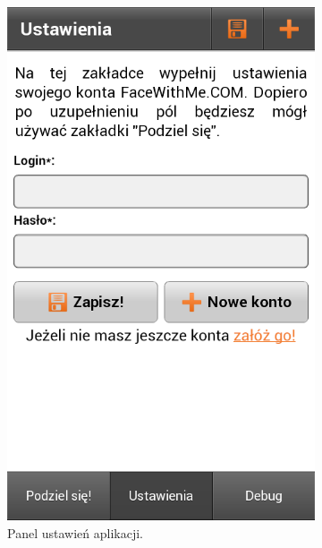 \begin{figure}[ht]
    \centering
    \begin{subfigure}{0.3\textwidth}
        \centering
        \includegraphics[width=\textwidth]{img/screens/mobile_broadcaster/panel-ustawien.png}
        \caption{Panel ustawień aplikacji.}
        \label{fig:MB3}
    \end{subfigure}
    \quad
    \begin{subfigure}{0.3\textwidth}
        \centering

\end{subfigure}
\end{figure}
